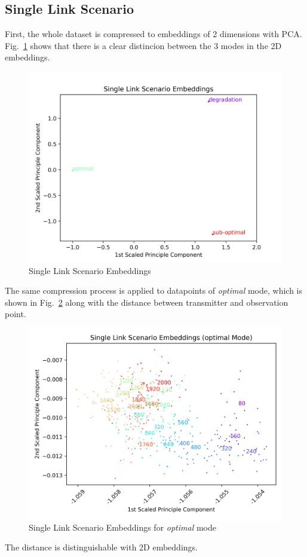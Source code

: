 \documentclass[lettersize,journal, one-column]{IEEEtran}
\begin{document}
\subsection{Single Link Scenario}
\label{section:results_single_link}
First, the whole dataset is compressed to embeddings of 2 dimensions with PCA.
Fig.~\ref{figure:single_whole} shows that there is a clear distincion between the 3 modes in the 2D embeddings.
\begin{figure}
	\centering
    \includegraphics[width=\columnwidth]{figures/single_scenario.png}
    \caption{Single Link Scenario Embeddings}
	\label{figure:single_whole}
\end{figure}
The same compression process is applied to datapoints of \textit{optimal} mode, which is shown in Fig.~\ref{figure:single_optimal} along with the distance between transmitter and observation point.
\begin{figure}
	\centering
    \includegraphics[width=\columnwidth]{figures/single_scenario(optimal).png}
    \caption{Single Link Scenario Embeddings for \textit{optimal} mode}
	\label{figure:single_optimal}
\end{figure}
The distance is distinguishable with 2D embeddings.
\end{document}
